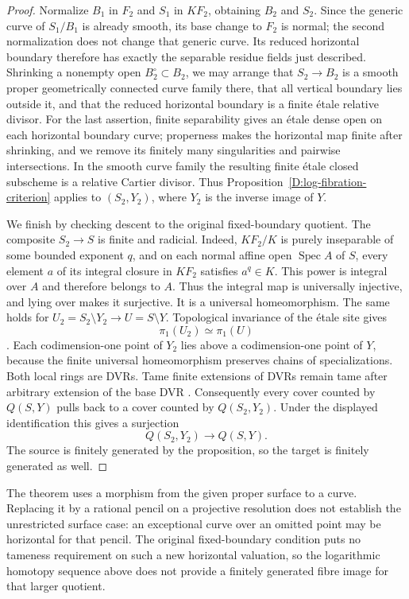 \begin{proof}
Normalize $B_1$ in $F_2$ and $S_1$ in $KF_2$, obtaining
$B_2$ and $S_2$.  Since the generic curve of $S_1/B_1$ is
already smooth, its base change to $F_2$ is normal; the second
normalization does not change that generic curve.  Its reduced
horizontal boundary therefore has exactly the separable
residue fields just described.  Shrinking a nonempty open
$B_2^\circ\subset B_2$, we may arrange that $S_2\to B_2$ is
a smooth proper geometrically connected curve family there,
that all vertical boundary lies outside it, and that the
reduced horizontal boundary is a finite \'etale relative
divisor.  For the last assertion, finite separability gives
an \'etale dense open on each horizontal boundary curve;
properness makes the horizontal map finite after shrinking,
and we remove its finitely many singularities and pairwise
intersections.  In the smooth curve family the resulting
finite \'etale closed subscheme is a relative Cartier divisor.
Thus Proposition~\ref{D:log-fibration-criterion} applies to
$(S_2,Y_2)$, where $Y_2$ is the inverse image of $Y$.

We finish by checking descent to the original fixed-boundary
quotient.  The composite $S_2\to S$ is finite and radicial.
Indeed, $KF_2/K$ is purely inseparable of some bounded
exponent $q$, and on each normal affine open $\operatorname{Spec}A$
of $S$, every element $a$ of its integral closure in $KF_2$
satisfies $a^q\in K$.  This power is integral over $A$ and
therefore belongs to $A$.  Thus the integral map is universally
injective, and lying over makes it surjective.  It is a
universal homeomorphism.  The same holds for
$U_2=S_2\setminus Y_2\to U=S\setminus Y$.
Topological invariance of the \'etale site gives
\[
                         \pi_1(U_2)\simeq\pi_1(U)
\]
\cite[Theorem 59.45.2, tag 04DY]{C_StacksLogFibration}.
Each codimension-one point of $Y_2$ lies above a
codimension-one point of $Y$, because the finite universal
homeomorphism preserves chains of specializations.  Both
local rings are DVRs.  Tame finite extensions of DVRs remain
tame after arbitrary extension of the base DVR
\cite[Lemma 15.116.9, tag 0EXY; Lemma 58.31.1, tag 0EYD]
{C_StacksLogFibration}.
Consequently every cover counted by $Q(S,Y)$ pulls back to
a cover counted by $Q(S_2,Y_2)$.  Under the displayed
identification this gives a surjection
\[
                         Q(S_2,Y_2)\longrightarrow Q(S,Y).
\]
The source is finitely generated by the proposition, so the
target is finitely generated as well.
\end{proof}

\begin{remark}
The theorem uses a morphism from the given proper surface to
a curve.  Replacing it by a rational pencil on a projective
resolution does not establish the unrestricted surface case:
an exceptional curve over an omitted point may be horizontal
for that pencil.  The original fixed-boundary condition puts
no tameness requirement on such a new horizontal valuation,
so the logarithmic homotopy sequence above does not provide
a finitely generated fibre image for that larger quotient.
\end{remark}
